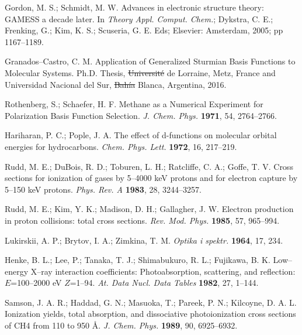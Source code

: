 \documentclass[10pt]{article}
\providecommand{\DIFaddtex}[1]{{\protect\color{blue}\uwave{#1}}} %
\providecommand{\DIFdeltex}[1]{{\protect\color{red}\sout{#1}}}                      %
\providecommand{\DIFaddbegin}{} %
\providecommand{\DIFaddend}{} %
\providecommand{\DIFdelbegin}{} %
\providecommand{\DIFdelend}{} %
\providecommand{\DIFadd}[1]{\texorpdfstring{\DIFaddtex{#1}}{#1}} %
\providecommand{\DIFdel}[1]{\texorpdfstring{\DIFdeltex{#1}}{}} %
\begin{document}
\begin{thebibliography}{10}
Gordon, M. S.; Schmidt, M. W.
Advances in electronic structure theory: GAMESS a decade later. 
In {\it Theory Appl. Comput. Chem.}; 
Dykstra, C. E.; Frenking, G.; Kim, K. S.; Scuseria, G. E. Eds;
Elsevier: Amsterdam, 2005; pp 1167--1189.

Granados--Castro, C. M.
Application of Generalized Sturmian Basis Functions to Molecular Systems.
Ph.D. Thesis, \DIFdelbegin \DIFdel{Université }\DIFdelend \DIFaddbegin \DIFadd{Universit\'e }\DIFaddend de Lorraine, Metz, France and 
Universidad Nacional del Sur, \DIFdelbegin \DIFdel{Bahía }\DIFdelend \DIFaddbegin \DIFadd{Bah\'ia }\DIFaddend Blanca, Argentina, 2016.

Rothenberg, S.; Schaefer, H. F.
Methane as a Numerical Experiment for Polarization Basis Function Selection.
{\it J. Chem. Phys.} {\bf 1971}, 54, 2764--2766.

Hariharan, P. C.; Pople, J. A.
The effect of d-functions on molecular orbital energies for hydrocarbons.
{\it Chem. Phys. Lett.} {\bf 1972}, 16, 217--219.

Rudd, M. E.; DuBois, R. D.; Toburen, L. H.; Ratcliffe, C. A.; Goffe, T. V.
Cross sections for ionization of gases by 5--4000 keV protons and for electron capture by 5--150 keV protons.
{\it Phys. Rev. A} {\bf 1983}, 28, 3244--3257.

Rudd, M. E.; Kim, Y. K.; Madison, D. H.; Gallagher, J. W.
Electron production in proton collisions: total cross sections.
{\it Rev. Mod. Phys.} {\bf 1985}, 57, 965--994.

Lukirskii, A. P.; Brytov, I. A.; Zimkina, T. M.
{\it Optika i spektr.} {\bf 1964}, 17, 234.

Henke, B. L.; Lee, P.; Tanaka, T. J.; Shimabukuro, R. L.; Fujikawa, B. K.
Low--energy X--ray interaction coefficients: Photoabsorption, scattering, and reflection: $E$=100--2000 eV $Z$=1--94.
{\it At. Data Nucl. Data Tables} {\bf 1982}, 27, 1--144.

Samson, J. A. R.; Haddad, G. N.; Masuoka, T.; Pareek, P. N.; Kilcoyne, D. A. L.
Ionization yields, total absorption, and dissociative photoionization cross sections of CH4 from 110 to 950 \AA.
{\it J. Chem. Phys.} {\bf 1989}, 90, 6925--6932.

\end{thebibliography}
\end{document}
